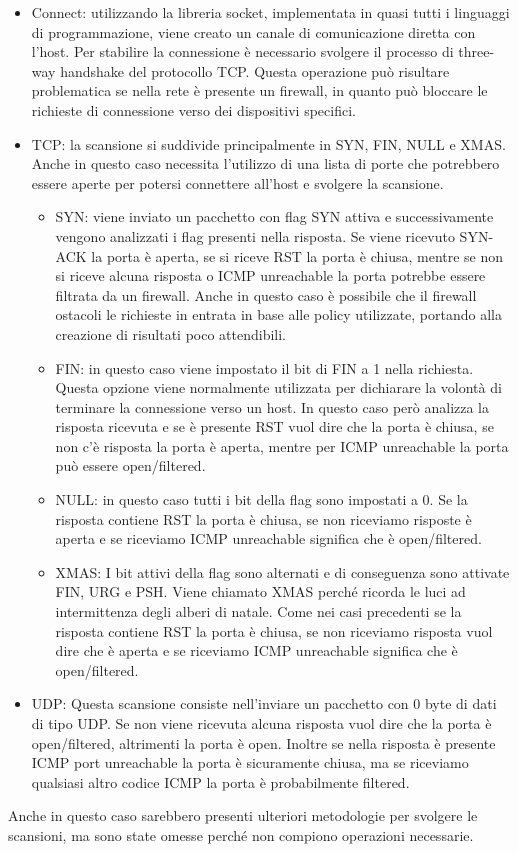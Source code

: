 \documentclass[12pt]{report}
\begin{document}
\begin{itemize}
    \item Connect: utilizzando la libreria socket, implementata in quasi tutti i linguaggi di programmazione, viene creato un canale di comunicazione diretta con l'host. Per stabilire la connessione è necessario svolgere il processo di three-way handshake del protocollo TCP. Questa operazione può risultare problematica se nella rete è presente un firewall, in quanto può bloccare le richieste di connessione verso dei dispositivi specifici.
    \item TCP: la scansione si suddivide principalmente in SYN, FIN, NULL e XMAS. Anche in questo caso necessita l'utilizzo di una lista di porte che potrebbero essere aperte per potersi connettere all'host e svolgere la scansione.
    \begin{itemize}
        \item SYN: viene inviato un pacchetto con flag SYN attiva e successivamente vengono analizzati i flag presenti nella risposta. Se viene ricevuto SYN-ACK la porta è aperta, se si riceve RST la porta è chiusa, mentre se non si riceve alcuna risposta o ICMP unreachable la porta potrebbe essere filtrata da un firewall. Anche in questo caso è possibile che il firewall ostacoli le richieste in entrata in base alle policy utilizzate, portando alla creazione di risultati poco attendibili.
        \item FIN: in questo caso viene impostato il bit di FIN a 1 nella richiesta. Questa opzione viene normalmente utilizzata per dichiarare la volontà di terminare la connessione verso un host. In questo caso però analizza la risposta ricevuta e se è presente RST vuol dire che la porta è chiusa, se non c'è risposta la porta è aperta, mentre per ICMP unreachable la porta può essere open/filtered.
        \item NULL: in questo caso tutti i bit della flag sono impostati a 0. Se la risposta contiene RST la porta è chiusa, se non riceviamo risposte è aperta e se riceviamo ICMP unreachable significa che è open/filtered.
        \item XMAS: I bit attivi della flag sono alternati e di conseguenza sono attivate FIN, URG e PSH. Viene chiamato XMAS perché ricorda le luci ad intermittenza degli alberi di natale. Come nei casi precedenti se la risposta contiene RST la porta è chiusa, se non riceviamo risposta vuol dire che è aperta e se riceviamo ICMP unreachable significa che è open/filtered.
    \end{itemize}
    \item UDP: Questa scansione consiste nell'inviare un pacchetto con 0 byte di dati di tipo UDP. Se non viene ricevuta alcuna risposta vuol dire che la porta è open/filtered, altrimenti la porta è open. Inoltre se nella risposta è presente ICMP port unreachable la porta è sicuramente chiusa, ma se riceviamo qualsiasi altro codice ICMP la porta è probabilmente filtered.
\end{itemize}
Anche in questo caso sarebbero presenti ulteriori metodologie per svolgere le scansioni, ma sono state omesse perché non compiono operazioni necessarie.
\end{document}
